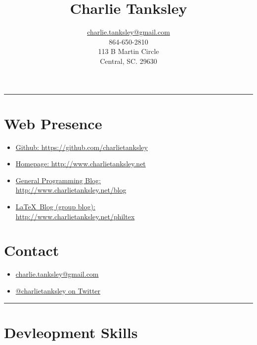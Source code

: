 \documentclass{article}
\title{Charlie Tanksley}
\author{\href{mailto:charlie.tanksley@gmail.com}{charlie.tanksley@gmail.com}\\
        864-650-2810\\
        113 B Martin Circle\\
        Central, SC. 29630}
\date{\nodate}
\begin{document}
\setlength{\droptitle}{-1in}
\maketitle
\thispagestyle{fancy}

\hrule
\begin{multicols}{2}

\section{Web Presence} %
\label{sec:Web Presence}

\begin{itemize}
  \item \href{https://github.com/charlietanksley}{Github:
    https://github.com/charlietanksley}
  \item \href{http://www.charlietanksley.net}{Homepage:
    http://www.charlietanksley.net}
  \item \href{http://www.charlietanksley.net/blog}{General Programming Blog:\\
    http://www.charlietanksley.net/blog}
  \item \href{http://www.charlietanksley.net/philtex}{\LaTeX\ Blog (group blog):\\
    http://www.charlietanksley.net/philtex}
\end{itemize}

\columnbreak
\section{Contact} %
\label{sec:Contact}

\begin{itemize}
  \item 
    \href{mailto:charlie.tanksley@gmail.com}{charlie.tanksley@gmail.com}
  \item \href{http://www.twitter.com/charlietanksley}{@charlietanksley 
    on Twitter}
\end{itemize}


\end{multicols}
\hrule
\section{Devleopment Skills} %
\label{sec:Devleopment Skills}
\end{document}
